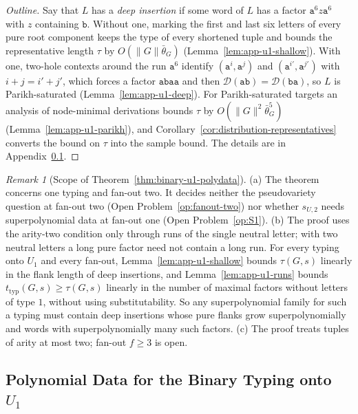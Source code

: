 \documentclass[11pt]{article}
\numberwithin{equation}{section}
\theoremstyle{plain}
\theoremstyle{definition}
\theoremstyle{remark}
\newtheorem{remark}[theorem]{Remark}
\newcommand{\D}{\mathcal{D}}
\theoremstyle{plain}
\begin{document}
\begin{proof}[Outline]
Say that $L$ has a \emph{deep insertion} if some word of $L$ has a factor
$\mathtt a^6z\mathtt a^6$ with $z$ containing $\mathtt b$.  Without one, marking the
first and last six letters of every pure root component keeps the type of
every shortened tuple and bounds the representative length $\tau$ by
$O(\|G\|\bar\theta_G)$ (Lemma~\ref{lem:app-u1-shallow}).  With one, two-hole
contexts around the run $\mathtt a^6$ identify $(\mathtt a^i,\mathtt a^j)$ and
$(\mathtt a^{i'},\mathtt a^{j'})$ with $i+j=i'+j'$, which forces a factor
$\mathtt a\mathtt b\mathtt a\mathtt a$ and then $\D(\mathtt{ab})=\D(\mathtt{ba})$, so
$L$ is Parikh-saturated (Lemma~\ref{lem:app-u1-deep}).  For Parikh-saturated
targets an analysis of node-minimal derivations bounds $\tau$ by
$O(\|G\|^2\bar\theta_G^5)$ (Lemma~\ref{lem:app-u1-parikh}), and
Corollary~\ref{cor:distribution-representatives} converts the bound on $\tau$
into the sample bound.  The details are in Appendix~\ref{app:binary-u1}.
\end{proof}

\begin{remark}[Scope of Theorem~\ref{thm:binary-u1-polydata}]
\label{rem:binary-u1-scope}
(a) The theorem concerns one typing and fan-out two.  It decides neither the
pseudovariety question at fan-out two (Open Problem~\ref{op:fanout-two}) nor
whether $s_{U,2}$ needs superpolynomial data at fan-out one (Open
Problem~\ref{op:S1}).
(b) The proof uses the arity-two condition only through runs of the single
neutral letter; with two neutral letters a long pure factor need not contain a
long run.  For every typing onto $U_1$ and every fan-out,
Lemma~\ref{lem:app-u1-shallow} bounds $\tau(G,s)$ linearly in the flank length
of deep insertions, and Lemma~\ref{lem:app-u1-runs} bounds
$t_{\mathrm{typ}}(G,s)\ge\tau(G,s)$ linearly in the number of maximal
factors without letters of type $1$, without using substitutability.  So any
superpolynomial family for such a typing must contain deep insertions whose
pure flanks grow superpolynomially and words with superpolynomially many such
factors.
(c) The proof treats tuples of arity at most two; fan-out $f\ge3$ is open.
\end{remark}


\subsection{Polynomial Data for the Binary Typing onto \texorpdfstring{$U_1$}{U1}}
\label{app:binary-u1}
\end{document}
